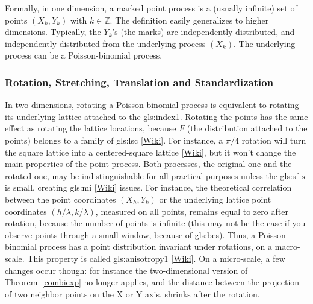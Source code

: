 \documentclass[10pt]{article}
\begin{document}
Formally, in one dimension, a marked point process is a (usually infinite) set of points $(X_k,Y_k)$ with $k\in\mathbb{Z}$. The definition easily generalizes to higher dimensions. Typically,
 the $Y_k$'s (the marks) are independently distributed, and independently distributed from the underlying process $(X_k)$. The underlying process can be a
Poisson-binomial process.

\subsubsection{Rotation, Stretching, Translation and Standardization}\label{stret1}

In two dimensions, rotating a Poisson-binomial process is equivalent to rotating its underlying \textcolor{index}{lattice} attached to the \gls{gls:index1}. Rotating the points has the same effect as rotating the lattice locations, because $F$ (the distribution attached to the points) belongs to a family of
\gls{gls:lsc} %
[\href{https://en.wikipedia.org/wiki/Location-scale_family}{Wiki}].
For instance, a $\pi/4$ rotation will turn the square lattice into a centered-square lattice [\href{https://en.wikipedia.org/wiki/Square_lattice}{Wiki}], but it won't change the main properties of the point process. Both processes, the original one and the rotated one, may be indistinguishable for all practical purposes unless the \gls{gls:sf} $s$ is small, creating
\gls{gls:mi} %
[\href{https://en.wikipedia.org/wiki/Identifiability}{Wiki}] issues. For instance, the theoretical correlation between the point coordinates $(X_h, Y_k)$ or the underlying lattice point coordinates $(h/\lambda,k/\lambda)$, measured on all points, remains equal to zero after rotation, because the number of points is infinite (this may not be the case if you observe points through a small window, because of
\glspl{gls:be}).
Thus, a Poisson-binomial process has a point distribution invariant under rotations, on a macro-scale. This property is called
\gls{gls:anisotropy1} [\href{https://en.wikipedia.org/wiki/Anisotropy}{Wiki}]. On a micro-scale, a few changes occur though: for instance the two-dimensional version of Theorem~\ref{combiexp} no longer applies, and the distance between the projection of two neighbor points on the X or Y axis, shrinks after the rotation.
\end{document}
